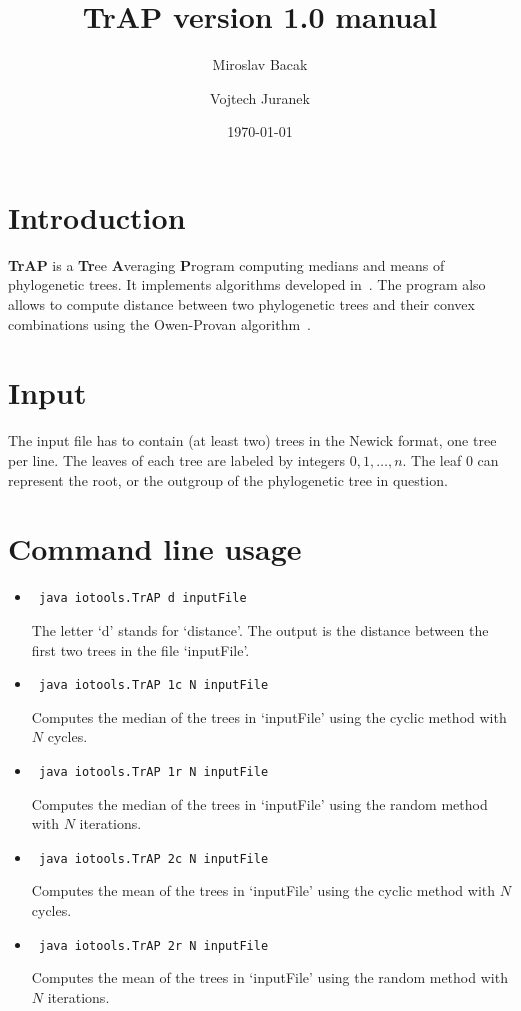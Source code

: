 \documentclass[a4paper,12pt]{amsart}
\title{TrAP version 1.0 manual}
\author{Miroslav Bacak \and Vojtech Juranek}
\date{\today}
\begin{document}
\maketitle

\section{Introduction}

\textbf{TrAP} is a \textbf{Tr}ee \textbf{A}veraging \textbf{P}rogram computing medians and means of phylogenetic trees. It implements algorithms developed in~\cite{mm}. The program also allows to compute distance between two phylogenetic trees and their convex combinations using the Owen-Provan algorithm~\cite{owenprovan}.


\section{Input}
The input file has to contain (at least two) trees in the Newick format, one tree per line. The leaves of each tree are labeled by integers $0,1,\dots,n.$ The leaf $0$ can represent the root, or the outgroup of the phylogenetic tree in question.

\section{Command line usage}

\begin{itemize}
\item
\begin{verbatim}
 java iotools.TrAP d inputFile
\end{verbatim}
The letter `d' stands for `distance'. The output is the distance between the first two trees in the file `inputFile'.

\item
\begin{verbatim}
 java iotools.TrAP 1c N inputFile
\end{verbatim}
Computes the median of the trees in `inputFile' using the cyclic method with $N$ cycles.

\item
\begin{verbatim}
 java iotools.TrAP 1r N inputFile
\end{verbatim}
Computes the median of the trees in `inputFile' using the random method with $N$ iterations.

\item
\begin{verbatim}
 java iotools.TrAP 2c N inputFile
\end{verbatim}
Computes the mean of the trees in `inputFile' using the cyclic method with $N$ cycles.

\item
\begin{verbatim}
 java iotools.TrAP 2r N inputFile
\end{verbatim}
Computes the mean of the trees in `inputFile' using the random method with $N$ iterations.

\end{itemize}
\end{document}
